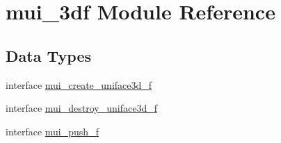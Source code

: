 \hypertarget{namespacemui__3df}{}\section{mui\+\_\+3df Module Reference}
\label{namespacemui__3df}
\subsection*{Data Types}
\begin{DoxyCompactItemize}
\item 
interface \hyperlink{interfacemui__3df_1_1mui__create__uniface3d__f}{mui\+\_\+create\+\_\+uniface3d\+\_\+f}
\item 
interface \hyperlink{interfacemui__3df_1_1mui__destroy__uniface3d__f}{mui\+\_\+destroy\+\_\+uniface3d\+\_\+f}
\item 
interface \hyperlink{interfacemui__3df_1_1mui__push__f}{mui\+\_\+push\+\_\+f}
\end{DoxyCompactItemize}
